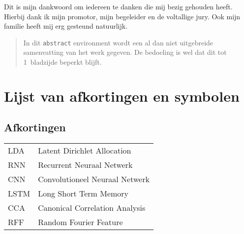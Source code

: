 \documentclass[master=cws,masteroption=ai]{kulemt}
\begin{document}
\begin{preface}
  Dit is mijn dankwoord om iedereen te danken die mij bezig gehouden heeft.
  Hierbij dank ik mijn promotor, mijn begeleider en de voltallige jury.
  Ook mijn familie heeft mij erg gesteund natuurlijk.
\end{preface}

\tableofcontents*

\begin{abstract}
  In dit \texttt{abstract} environment wordt een al dan niet uitgebreide
  samenvatting van het werk gegeven. De bedoeling is wel dat dit tot
  1~bladzijde beperkt blijft.

  \lipsum[1]
\end{abstract}                                                                                                                                                                                                                                                                                                                                                                                                                                                                                                                                                                                                                                                                                                                 

\listoffiguresandtables
\chapter{Lijst van afkortingen en symbolen}
\section*{Afkortingen}
\begin{flushleft}
  \renewcommand{\arraystretch}{1.1}
  \begin{tabularx}{\textwidth}{@{}p{12mm}X@{}}
    LDA  & Latent Dirichlet Allocation \\
    RNN & Recurrent Neuraal Netwerk \\
    CNN & Convolutioneel Neuraal Netwerk \\
    LSTM & Long Short Term Memory \\
    CCA & Canonical Correlation Analysis \\
    RFF & Random Fourier Feature
    
    
  \end{tabularx}
\end{flushleft}
\end{document}
